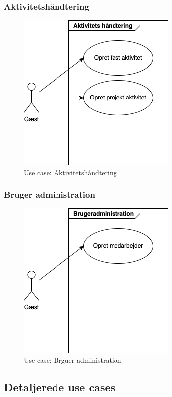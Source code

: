 \subsubsection{Aktivitetshåndtering}
\begin{figure}[ht]
    \centering
    \includegraphics{diagrams/guest_activity}
    \caption{Use case: Aktivitetshåndtering}
    \label{fig:my_image}
\end{figure}


\subsubsection{Bruger administration} 
\begin{figure}[ht]
    \centering
    \includegraphics{diagrams/guest_users}
    \caption{Use case: Brguer administration}
    \label{fig:my_image}
\end{figure}

\subsection{Detaljerede use cases}


